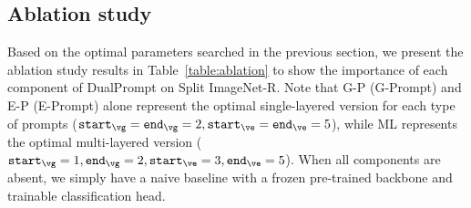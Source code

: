 \documentclass[runningheads]{llncs}
\newcommand{\method}{DualPrompt\xspace}
\newcommand{\gprompt}{G-Prompt\xspace}
\newcommand{\eprompt}{E-Prompt\xspace}
\def \iep{\texttt{start}_{\ve}}
\def \jep{\texttt{end}_{\ve}}
\def \igp{\texttt{start}_{\vg}}
\def \jgp{\texttt{end}_{\vg}}
\begin{document}








\subsection{Ablation study}
\label{sec:ablation}
Based on the optimal parameters searched in the previous section, we present the ablation study results in Table~\ref{table:ablation} to show the importance of each component of \method on Split ImageNet-R. Note that G-P (\gprompt) and E-P (\eprompt) alone represent the optimal single-layered version for each type of prompts ($\igp=\jgp=2, \iep=\jep=5$), while ML represents the optimal multi-layered version ($\igp=1, \jgp=2, \iep=3, \jep=5$). When all components are absent, we simply have a naive baseline with a frozen pre-trained backbone and trainable classification head.
\end{document}
